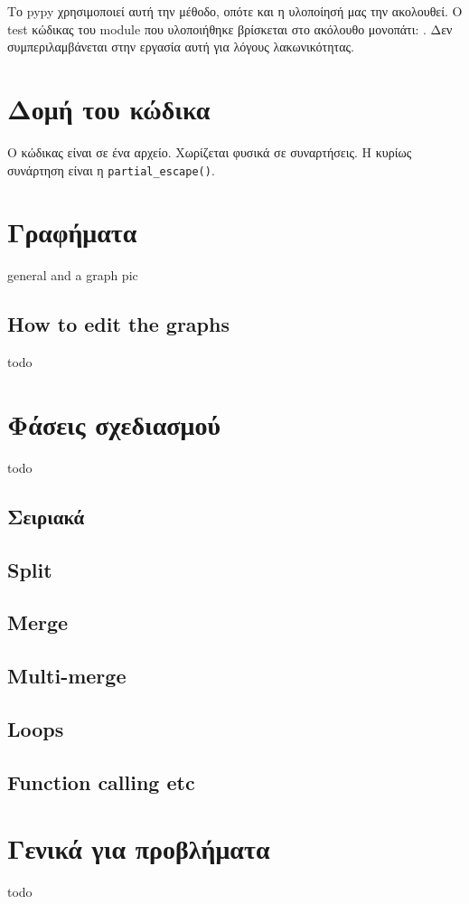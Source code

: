 Το pypy χρησιμοποιεί αυτή την μέθοδο, οπότε και η υλοποίησή μας την ακολουθεί. Ο
test κώδικας του module που υλοποιήθηκε βρίσκεται στο ακόλουθο μονοπάτι:
. Δεν
συμπεριλαμβάνεται στην εργασία αυτή για λόγους λακωνικότητας.


\section{Δομή του κώδικα}

Ο κώδικας είναι σε ένα αρχείο. Χωρίζεται φυσικά σε συναρτήσεις. Η κυρίως
συνάρτηση είναι η \texttt{partial\_escape()}.


\section{Γραφήματα}

general and a graph pic

\subsection{How to edit the graphs}

todo


\section{Φάσεις σχεδιασμού}

todo

\subsection{Σειριακά}
\subsection{Split}
\subsection{Merge}
\subsection{Multi-merge}
\subsection{Loops}
\subsection{Function calling etc}


\section{Γενικά για προβλήματα}

todo

